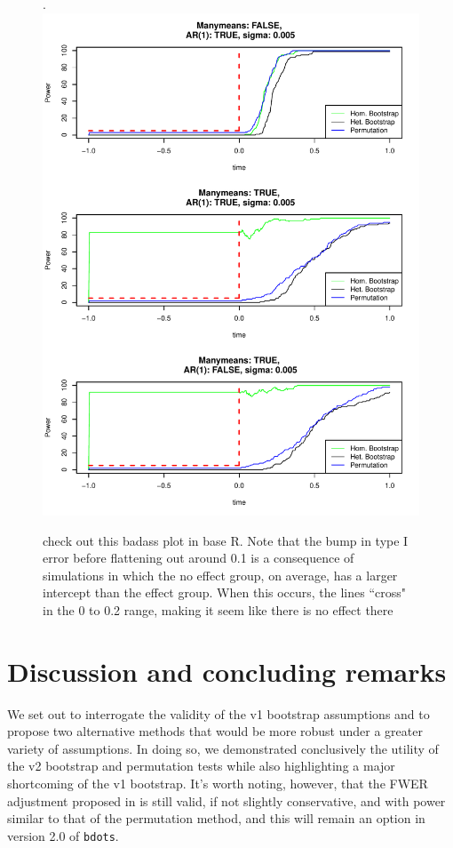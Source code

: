 \documentclass{article}
\newcommand{\xt}{\texttt}
\begin{document}
\begin{figure}[H]
\centering.
\includegraphics[width=\textwidth]{type_two_err_time_slice.pdf}
\caption{check out this badass plot in base R. Note that the bump in type I error before flattening out around 0.1 is a consequence of simulations in which the no effect group, on average, has a larger intercept than the effect group. When this occurs, the lines ``cross" in the 0 to 0.2 range, making it seem like there is no effect there}
\label{fig:time_power_plot}
\end{figure}


\section{Discussion and concluding remarks}

We set out to interrogate the validity of the v1 bootstrap assumptions and to propose two alternative methods that would be more robust under a greater variety of assumptions. In doing so, we demonstrated conclusively the utility of the v2 bootstrap and permutation tests while also highlighting a major shortcoming of the v1 bootstrap. It's worth noting, however, that the FWER adjustment proposed in \cite{Oleson2017} is still valid, if not slightly conservative, and with power similar to that of the permutation method, and this will remain an option in version 2.0 of \xt{bdots}.
\end{document}
